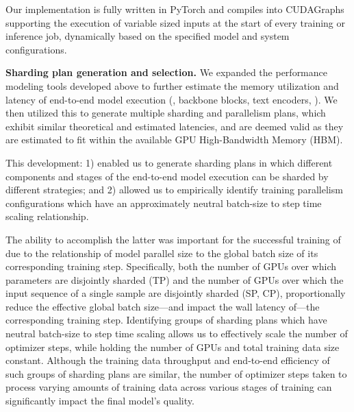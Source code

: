 Our implementation is fully written in PyTorch and compiles into CUDAGraphs supporting the execution of variable sized inputs at the start of every training or inference job, dynamically based on the specified model and system configurations.

\noindent \textbf{Sharding plan generation and selection.}
We expanded the performance modeling tools developed above to further estimate the memory utilization and latency of end-to-end model execution (\eg, backbone blocks, text encoders, \taeShort). We then utilized this to generate multiple sharding and parallelism plans, which exhibit similar theoretical and estimated latencies, and are deemed valid as they are estimated to fit within the available GPU High-Bandwidth Memory (HBM).

This development: 1) enabled us to generate sharding plans in which different components and stages of the end-to-end model execution can be sharded by different strategies; and 2) allowed us to empirically identify training parallelism configurations which have an approximately neutral batch-size to step time scaling relationship.

The ability to accomplish the latter was important for the successful training of \OursVideo due to the relationship of model parallel size to the global batch size of its corresponding training step. Specifically, both the number of GPUs over which parameters are disjointly sharded (TP) and the number of GPUs over which the input sequence of a single sample are disjointly sharded (SP, CP), proportionally reduce the effective global batch size—and impact the wall latency of—the corresponding training step. Identifying groups of sharding plans which have neutral batch-size to step time scaling allows us to effectively scale the number of optimizer steps, while holding the number of GPUs and total training data size constant. Although the training data throughput and end-to-end efficiency of such groups of sharding plans are similar, the number of optimizer steps taken to process varying amounts of training data across various stages of training can significantly impact the final model's quality.

